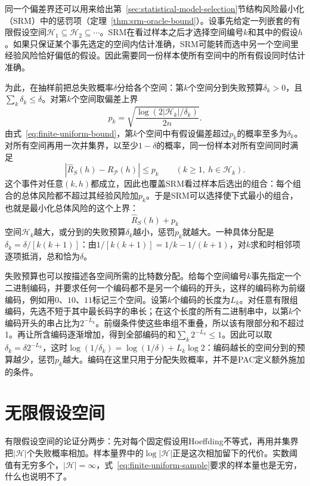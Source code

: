 同一个偏差界还可以用来给出第~\ref{sec:statistical-model-selection}节结构风险最小化（SRM）中的惩罚项（定理~\ref{thm:srm-oracle-bound}）。设事先给定一列嵌套的有限假设空间$\mathcal H_1\subseteq\mathcal H_2\subseteq\cdots$。SRM在看过样本之后才选择空间编号$k$和其中的假设$h$。如果只保证某个事先选定的空间内估计准确，SRM可能转而选中另一个空间里经验风险恰好偏低的假设。因此需要同一份样本使所有空间中的所有假设同时估计准确。

为此，在抽样前把总失败概率$\delta$分给各个空间：第$k$个空间分到失败预算$\delta_k>0$，且$\sum_k\delta_k\leq\delta$。对第$k$个空间取偏差上界
\[
 p_k=\sqrt{\frac{\log(2|\mathcal H_k|/\delta_k)}{2n}}.
\]
由式~\eqref{eq:finite-uniform-bound}，第$k$个空间中有假设偏差超过$p_k$的概率至多为$\delta_k$。对所有空间再用一次并集界，以至少$1-\delta$的概率，同一份样本对所有空间同时满足
\[
 |\hat R_S(h)-R_{\mathcal P}(h)|\leq p_k
 \qquad(k\geq1,\ h\in\mathcal H_k).
\]
这个事件对任意$(k,h)$都成立，因此也覆盖SRM看过样本后选出的组合：每个组合的总体风险都不超过其经验风险加$p_k$。于是SRM可以选择使下式最小的组合，也就是最小化总体风险的这个上界：
\begin{equation}
 \hat R_S(h)+p_k
 \label{eq:srm-finite-penalty}
\end{equation}
空间$\mathcal H_k$越大，或分到的失败预算$\delta_k$越小，惩罚$p_k$就越大。一种具体分配是$\delta_k=\delta/[k(k+1)]$：由$1/[k(k+1)]=1/k-1/(k+1)$，对$k$求和时相邻项逐项抵消，总和恰为$\delta$。

失败预算也可以按描述各空间所需的比特数分配。给每个空间编号$k$事先指定一个二进制编码，并要求任何一个编码都不是另一个编码的开头，这样的编码称为前缀编码，例如用$0$、$10$、$11$标记三个空间。设第$k$个编码的长度为$L_k$。对任意有限组编码，先选不短于其中最长码字的串长；在这个长度的所有二进制串中，以第$k$个编码开头的串占比为$2^{-L_k}$。前缀条件使这些串组不重叠，所以该有限部分和不超过1。再让所含编码逐渐增加，得到全部编码的和$\sum_k2^{-L_k}\leq1$。因此可以取$\delta_k=\delta2^{-L_k}$，这时$\log(1/\delta_k)=\log(1/\delta)+L_k\log2$：编码越长的空间分到的预算越少，惩罚$p_k$越大。编码在这里只用于分配失败概率，并不是PAC定义额外施加的条件。

\section{无限假设空间}
\label{sec:binary-infinite-class}

有限假设空间的论证分两步：先对每个固定假设用Hoeffding不等式，再用并集界把$|\mathcal H|$个失败概率相加。样本量界中的$\log|\mathcal H|$正是这次相加留下的代价。实数阈值有无穷多个，$|\mathcal H|=\infty$，式~\eqref{eq:finite-uniform-sample}要求的样本量也是无穷，什么也说明不了。

